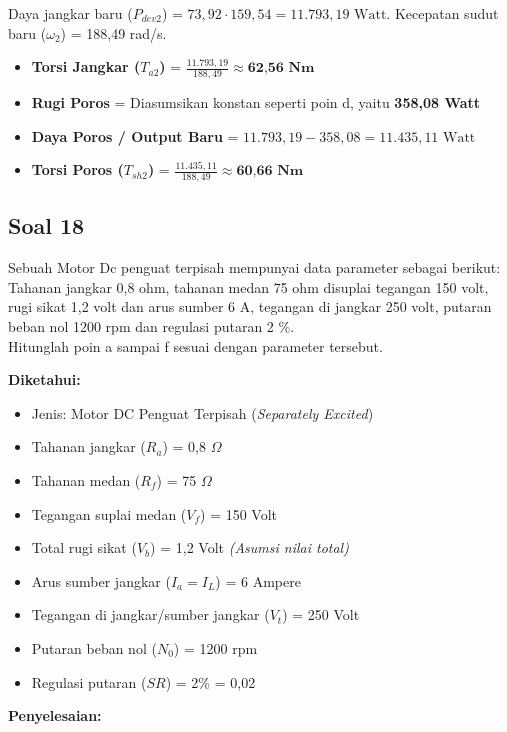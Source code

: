 \documentclass[12pt, a4paper]{article}
\begin{document}
\begin{enumerate}[label=\alph*.]
    Daya jangkar baru ($P_{dev2}$) = $73,92 \cdot 159,54 = 11.793,19 \text{ Watt}$. Kecepatan sudut baru ($\omega_2$) = 188,49 rad/s.
    \begin{itemize}
        \item \textbf{Torsi Jangkar ($T_{a2}$)} = $\frac{11.793,19}{188,49} \approx \textbf{62,56 Nm}$
        \item \textbf{Rugi Poros} = Diasumsikan konstan seperti poin d, yaitu \textbf{358,08 Watt}
        \item \textbf{Daya Poros / Output Baru} = $11.793,19 - 358,08 = 11.435,11 \text{ Watt}$
        \item \textbf{Torsi Poros ($T_{sh2}$)} = $\frac{11.435,11}{188,49} \approx \textbf{60,66 Nm}$
    \end{itemize}
\end{enumerate}

\subsection*{Soal 18}
Sebuah Motor Dc penguat terpisah mempunyai data parameter sebagai berikut: Tahanan jangkar 0,8 ohm, tahanan medan 75 ohm disuplai tegangan 150 volt, rugi sikat 1,2 volt dan arus sumber 6 A, tegangan di jangkar 250 volt, putaran beban nol 1200 rpm dan regulasi putaran 2 \%.\\
Hitunglah poin a sampai f sesuai dengan parameter tersebut.

\textbf{Diketahui:}
\begin{itemize}
    \item Jenis: Motor DC Penguat Terpisah (\textit{Separately Excited})
    \item Tahanan jangkar ($R_a$) = 0,8 $\Omega$
    \item Tahanan medan ($R_f$) = 75 $\Omega$
    \item Tegangan suplai medan ($V_f$) = 150 Volt
    \item Total rugi sikat ($V_b$) = 1,2 Volt \textit{(Asumsi nilai total)}
    \item Arus sumber jangkar ($I_a = I_L$) = 6 Ampere
    \item Tegangan di jangkar/sumber jangkar ($V_t$) = 250 Volt
    \item Putaran beban nol ($N_0$) = 1200 rpm
    \item Regulasi putaran ($SR$) = 2\% = 0,02
\end{itemize}

\textbf{Penyelesaian:}
\end{document}
